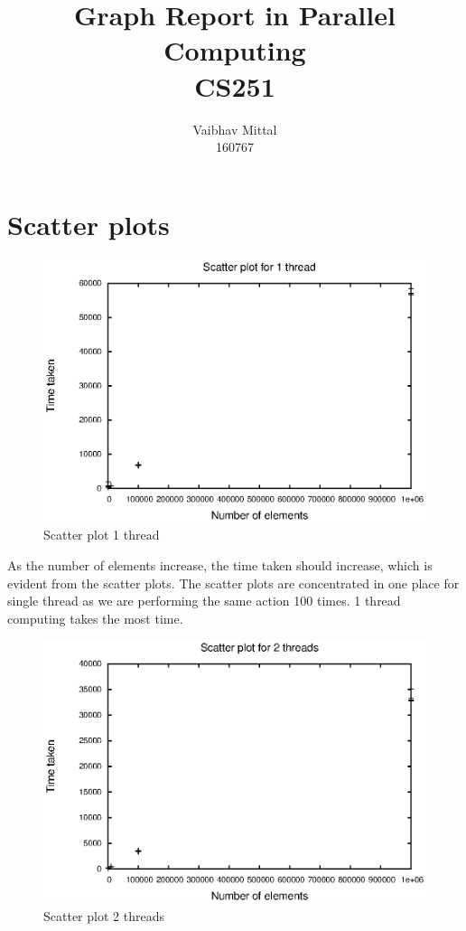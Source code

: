 \documentclass[a4paper, 12pt]{report}
\title{Graph Report in Parallel Computing\\CS251}
\author{Vaibhav Mittal\\160767}
\begin{document}
\maketitle

\chapter{Scatter plots}

\begin{figure}[H]
\centering
\includegraphics[width=1\textwidth]{scatter_1.eps}
 \caption{Scatter plot 1 thread}
\end{figure}

\vskip 0.5in
{\Large As the number of elements increase, the time taken should increase, which is evident from the scatter plots. The scatter plots are concentrated in one place for single thread as we are performing the same action 100 times. 1 thread computing takes the most time.}


\begin{figure}[H]
\centering
\includegraphics[width=1\textwidth]{scatter_2.eps}
 \caption{Scatter plot 2 threads}
 \label{fig:cc_get}
\end{figure}
\end{document}
